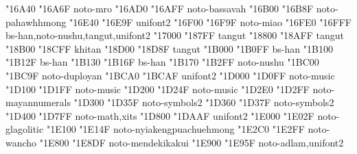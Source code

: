 \documentclass{article}
\begin{document}
                                            { "16A40} { "16A6F} {noto-mro}
                                      { "16AD0} { "16AFF} {noto-bassavah}
                                   { "16B00} { "16B8F} {noto-pahawhhmong}
                                    { "16E40} { "16E9F} {unifont2}
                                           { "16F00} { "16F9F} {noto-miao}
            { "16FE0} { "16FFF} {bs-han,noto-nushu,tangut,unifont2}
                                         { "17000} { "187FF} {tangut}
                              { "18800} { "18AFF} {tangut}
                            { "18B00} { "18CFF} {khitan}
                              { "18D00} { "18D8F} {tangut}
                                { "1B000} { "1B0FF} {bs-han}
                                { "1B100} { "1B12F} {bs-han}
                           { "1B130} { "1B16F} {bs-han}
                                          { "1B170} { "1B2FF} {noto-nushu}
                                       { "1BC00} { "1BC9F} {noto-duployan}
                      { "1BCA0} { "1BCAF} {unifont2}
                      { "1D000} { "1D0FF} {noto-music}
                                { "1D100} { "1D1FF} {noto-music}
                 { "1D200} { "1D24F} {noto-music}
                                 { "1D2E0} { "1D2FF} {noto-mayannumerals}
                          { "1D300} { "1D35F} {noto-symbols2}
                          { "1D360} { "1D37F} {noto-symbols2}
              { "1D400} { "1D7FF} {noto-math,xits}
                             { "1D800} { "1DAAF} {unifont2}
                          { "1E000} { "1E02F} {noto-glagolitic}
                         { "1E100} { "1E14F} {noto-nyiakengpuachuehmong}
                                         { "1E2C0} { "1E2FF} {noto-wancho}
                                  { "1E800} { "1E8DF} {noto-mendekikakui}
                                          { "1E900} { "1E95F} {noto-adlam,unifont2}
\end{document}
